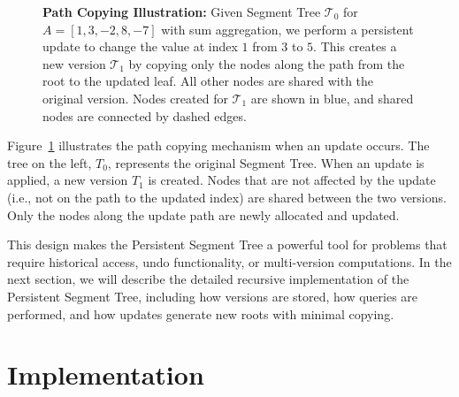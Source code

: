 \documentclass{fairmeta}
\numberwithin{equation}{section}
\begin{document}
\begin{figure}[H]
    \caption{\textbf{Path Copying Illustration:} Given Segment Tree $\mathcal{T}_0$ for $A = [1, 3, -2, 8, -7]$ with sum aggregation, we perform a persistent update to change the value at index $1$ from $3$ to $5$. This creates a new version $\mathcal{T}_1$ by copying only the nodes along the path from the root to the updated leaf. All other nodes are shared with the original version. Nodes created for $\mathcal{T}_1$ are shown in blue, and shared nodes are connected by dashed edges.}
    \label{fig:pathcopying}
\end{figure}


Figure~\ref{fig:pathcopying} illustrates the path copying mechanism when an update occurs. The tree on the left, $T_0$, represents the original Segment Tree. When an update is applied, a new version $T_1$ is created. Nodes that are not affected by the update (i.e., not on the path to the updated index) are shared between the two versions. Only the nodes along the update path are newly allocated and updated.

This design makes the Persistent Segment Tree a powerful tool for problems that require historical access, undo functionality, or multi-version computations. In the next section, we will describe the detailed recursive implementation of the Persistent Segment Tree, including how versions are stored, how queries are performed, and how updates generate new roots with minimal copying.

\section{Implementation}\label{section:implementation}
\end{document}
